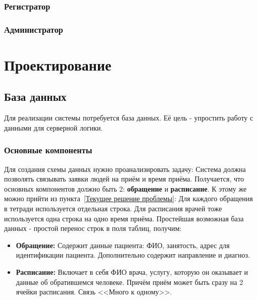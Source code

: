 \documentclass[a4paper,article]{article}
\begin{document}
    \subsubsection{Регистратор}

    \subsubsection{Администратор}

    \pagestyle{plain}

    \newpage

    \section{Проектирование}

    \subsection{База данных}

    Для реализации системы потребуется база данных. Её цель - упростить работу с данными для серверной логики.

    \subsubsection{Основные компоненты}\label{Проектирование БД. Основные компоненты}

    Для создания схемы данных нужно проанализировать задачу: Система должна позволять связывать заявки людей на приём и время приёма. Получается, что основных компонентов должно быть 2: \textbf{обращение} и \textbf{расписание}. К этому же можно прийти из пункта~\ref{Текущее решение проблемы}: Для каждого обращения в тетради используется отдельная строка. Для расписания врачей тоже используется одна строка на одно время приёма. Простейшая возможная база данных - простой перенос строк в поля таблиц, получим:

    \begin{itemize}[nolistsep]
        \item \textbf{Обращение:} Содержит данные пациента: ФИО, занятость, адрес для идентификации пациента. Дополнительно содержит направление и диагноз.
        \item \textbf{Расписание:} Включает в себя ФИО врача, услугу, которую он оказывает и данные об обратившемся человеке. Причём приём может быть сразу на 2 ячейки расписания. Связь <<Много к одному>>.
    \end{itemize}
\end{document}
